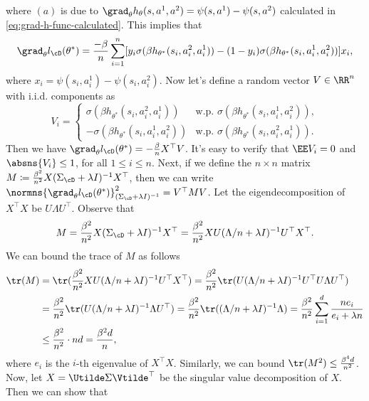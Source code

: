where $(a)$ is due to $\grad_\theta h_\theta(s,a^1,a^2)=\psi(s,a^1)-\psi(s,a^2)$ calculated in \cref{eq:grad-h-func-calculated}. This implies that
\begin{equation}\label{eq:non-robust-dpo-grad-sample-loss}
    \grad_\theta l_{\cD}(\theta^*) = \frac{-\beta}{n}\sum_{i=1}^n [y_i\sigma(\beta h_{\theta^*}(s_i,a_i^2,a_i^1)) - (1-y_i)\sigma(\beta h_{\theta^*}(s_i,a_i^1,a_i^2))] x_i,
\end{equation}
where $x_i = \psi(s_i,a_i^1)-\psi(s_i,a_i^2)$. Now let's define a random vector $V\in\RR^n$ with i.i.d. components as
\begin{equation}\label{eq:non-robust-dpo-quadradic-rv}
    V_i = \begin{cases}
        \sigma(\beta h_{\theta^*}(s_i,a_i^2,a_i^1)) & \text{w.p. } \sigma(\beta h_{\theta^*}(s_i,a_i^1,a_i^2)), \\
        -\sigma(\beta h_{\theta^*}(s_i,a_i^1,a_i^2)) & \text{w.p. } \sigma(\beta h_{\theta^*}(s_i,a_i^2,a_i^1)).
    \end{cases}
\end{equation}
Then we have $\grad_\theta l_{\cD}(\theta^*)=-\frac{\beta}{n}X^{\top} V$. It's easy to verify that $\EE V_i = 0$ and $\absns{V_i}\leq 1$, for all $1\leq i\leq n$. Next, if we define the $n\times n$ matrix $M\coloneqq \frac{\beta^2}{n^2} X(\Sigma_{\cD}+\lambda I)^{-1}X^{\top}$, then we can write $\normns{\grad_\theta l_{\cD}(\theta^*)}_{(\Sigma_{\cD}+\lambda I)^{-1}}^2=V^{\top}MV$. Let the eigendecomposition of $X^{\top}X$ be $U\Lambda U^{\top}$. Observe that
\begin{equation*}
    M = \frac{\beta^2}{n^2} X(\Sigma_{\cD}+\lambda I)^{-1} X^{\top} = \frac{\beta^2}{n^2} XU(\Lambda/n+\lambda I)^{-1}U^{\top} X^{\top}.
\end{equation*}
We can bound the trace of $M$ as follows
\begin{align*}
    \tr(M) &= \tr(\frac{\beta^2}{n^2} XU(\Lambda/n+\lambda I)^{-1}U^{\top} X^{\top}) = \frac{\beta^2}{n^2} \tr(U(\Lambda/n+\lambda I)^{-1}U^{\top} U\Lambda U^{\top}) \\
    &= \frac{\beta^2}{n^2} \tr(U(\Lambda/n+\lambda I)^{-1}\Lambda U^{\top}) =\frac{\beta^2}{n^2}\tr((\Lambda/n+\lambda I)^{-1}\Lambda)  = \frac{\beta^2}{n^2} \sum_{i=1}^d \frac{n e_i}{e_i+\lambda n} \\
    &\leq \frac{\beta^2}{n^2} \cdot nd = \frac{\beta^2 d}{n},
\end{align*}
where $e_i$ is the $i$-th eigenvalue of $X^{\top}X$. Similarly, we can bound $\tr(M^2)\leq \frac{\beta^4 d}{n^2}$. Now, let $X = \Utilde \Sigma \Vtilde^{\top}$ be the singular value decomposition of $X$. Then we can show that
